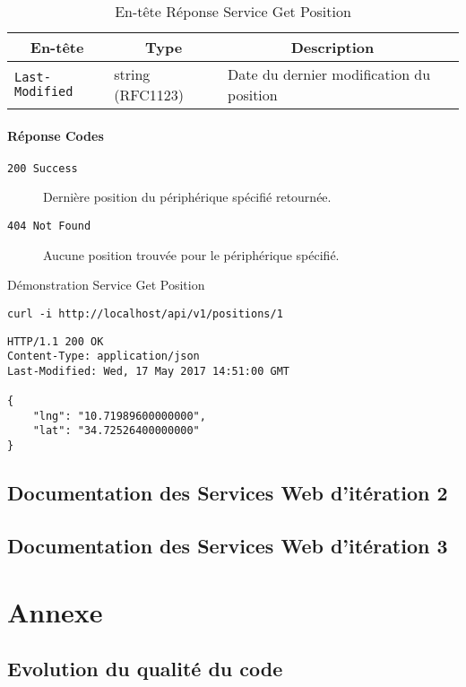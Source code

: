 \begin{table}[htbp]
    \centering
    \caption*{En-tête Réponse Service Get Position}
    \begin{tabular}{llll}
        \toprule
        \multicolumn{1}{c}{\textbf{En-tête}} &
        \multicolumn{1}{c}{\textbf{Type}} &
        \multicolumn{1}{c}{\textbf{Description}} \\
        \midrule
        \verb|Last-Modified| & string (RFC1123) & Date du dernier modification du position \\
        \bottomrule
    \end{tabular}
\end{table}

\subsubsection*{Réponse Codes}
\begin{description}
    \item[\texttt{200 Success}] Dernière position du périphérique spécifié retournée.
    \item[\texttt{404 Not Found}] Aucune position trouvée pour le périphérique spécifié.
\end{description}

\begin{listing}
    \caption*{Démonstration Service Get Position}
    \begin{verbatim}
curl -i http://localhost/api/v1/positions/1
\end{verbatim}
\begin{verbatim}
HTTP/1.1 200 OK
Content-Type: application/json
Last-Modified: Wed, 17 May 2017 14:51:00 GMT

{
    "lng": "10.71989600000000",
    "lat": "34.72526400000000"
}
\end{verbatim}
\end{listing}

\clearpage
\section{Documentation des Services Web d'itération 2}


\clearpage
\section{Documentation des Services Web d'itération 3}


\clearpage
\chapter{Annexe}

\section{Evolution du qualité du code}

